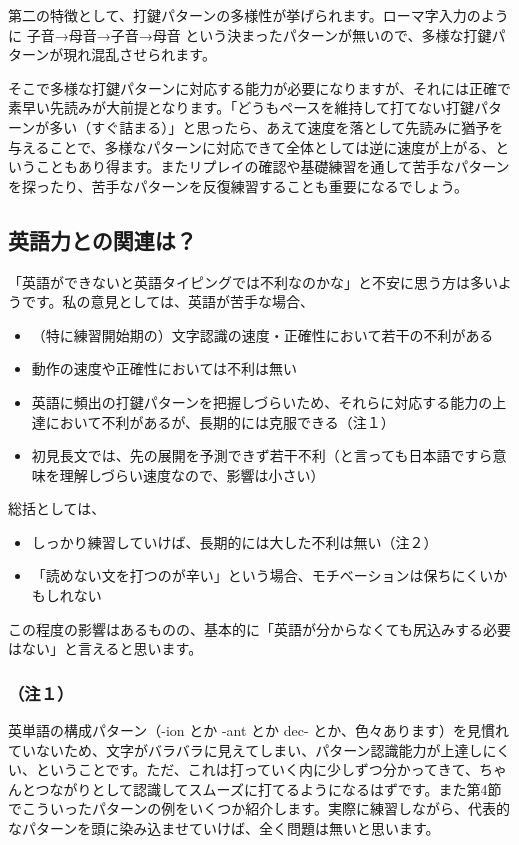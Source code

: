 第二の特徴として、打鍵パターンの多様性が挙げられます。ローマ字入力のように 子音→母音→子音→母音 という決まったパターンが無いので、多様な打鍵パターンが現れ混乱させられます。

そこで多様な打鍵パターンに対応する能力が必要になりますが、それには正確で素早い先読みが大前提となります。「どうもペースを維持して打てない打鍵パターンが多い（すぐ詰まる）」と思ったら、あえて速度を落として先読みに猶予を与えることで、多様なパターンに対応できて全体としては逆に速度が上がる、ということもあり得ます。またリプレイの確認や基礎練習を通して苦手なパターンを探ったり、苦手なパターンを反復練習することも重要になるでしょう。

\subsection{英語力との関連は？}

「英語ができないと英語タイピングでは不利なのかな」と不安に思う方は多いようです。私の意見としては、英語が苦手な場合、
\begin{itemize}
 \item （特に練習開始期の）文字認識の速度・正確性において若干の不利がある
 \item 動作の速度や正確性においては不利は無い
 \item 英語に頻出の打鍵パターンを把握しづらいため、それらに対応する能力の上達において不利があるが、長期的には克服できる（注１）
 \item 初見長文では、先の展開を予測できず若干不利（と言っても日本語ですら意味を理解しづらい速度なので、影響は小さい）
\end{itemize}

総括としては、
\begin{itemize}
 \item しっかり練習していけば、長期的には大した不利は無い（注２）
 \item 「読めない文を打つのが辛い」という場合、モチベーションは保ちにくいかもしれない
\end{itemize}

この程度の影響はあるものの、基本的に「英語が分からなくても尻込みする必要はない」と言えると思います。

\subsubsection*{（注１）}
英単語の構成パターン（-ion とか -ant とか dec- とか、色々あります）を見慣れていないため、文字がバラバラに見えてしまい、パターン認識能力が上達しにくい、ということです。ただ、これは打っていく内に少しずつ分かってきて、ちゃんとつながりとして認識してスムーズに打てるようになるはずです。また第4節でこういったパターンの例をいくつか紹介します。実際に練習しながら、代表的なパターンを頭に染み込ませていけば、全く問題は無いと思います。

